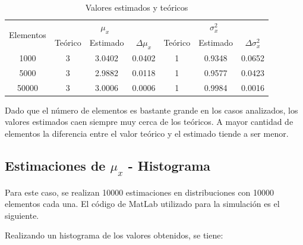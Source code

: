 \begin{table}[!ht]
\begin{centering}

\begin{tabular}{|c||c|c|c||c|c|c|}
\hline 
\multirow{2}{*}{Elementos} & \multicolumn{3}{c||}{$\mu_x$} & \multicolumn{3}{c|}{$\sigma^2_x$}\tabularnewline
\cline{2-7} 
 & Te\'orico & Estimado & $\Delta \mu_x$ & Te\'orico & Estimado & $\Delta \sigma^2_x$ \\
\hline 
\hline 
1000 & 3 & 3.0402 & 0.0402 & 1 & 0.9348 & 0.0652\\
\hline 
5000 & 3 & 2.9882 & 0.0118 & 1 & 0.9577 & 0.0423\\
\hline 
50000 & 3 & 3.0006 & 0.0006 & 1 & 0.9984 & 0.0016\\
\hline 
\end{tabular}
\par\end{centering}
\caption{Valores estimados y te\'oricos}

\end{table}

Dado que el n\'umero de elementos es bastante grande en los casos analizados, los valores estimados caen siempre muy cerca de los te\'oricos. A mayor cantidad de elementos la diferencia entre el valor te\'orico y el estimado tiende a ser menor.

\subsection{Estimaciones de $\mu_x$ - Histograma}

Para este caso, se realizan 10000 estimaciones en distribuciones con 10000 elementos cada una. El c\'odigo de MatLab utilizado para la simulaci\'on es el siguiente.



\newpage

Realizando un histograma de los valores obtenidos, se tiene:

